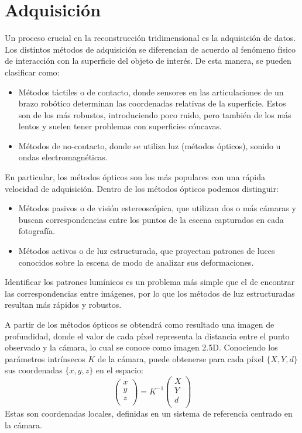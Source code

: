 \section{Adquisición}
Un proceso crucial en la reconstrucción tridimensional es la adquisición de datos.
Los distintos métodos de adquisición se diferencian de acuerdo al fenómeno físico de interacción
con la superficie del objeto de interés. De esta manera, se pueden clasificar como:
	\begin{itemize}
		\item Métodos táctiles o de contacto, donde sensores en las articulaciones de un brazo robótico determinan las coordenadas relativas de la superficie. Estos son de los más robustos, introduciendo poco ruido, pero también de los más lentos y suelen tener problemas con superficies cóncavas.
		\item Métodos de no-contacto, donde se utiliza luz (métodos ópticos), sonido u ondas electromagnéticas.
	\end{itemize}

En particular, los métodos ópticos son los más populares con una rápida velocidad de adquisición\cite{Várady97reverseengineering}. %
Dentro de los métodos ópticos podemos distinguir:
\begin{itemize}
	\item Métodos pasivos o de visión estereoscópica,
		que utilizan dos o más cámaras y buscan correspondencias
		entre los puntos de la escena capturados en cada fotografía.
	\item Métodos activos o de luz estructurada,
		que proyectan patrones de luces conocidos sobre la escena de modo de analizar sus deformaciones.
\end{itemize}
Identificar los patrones lumínicos es un problema más simple que el de
encontrar las correspondencias entre imágenes, por lo que los métodos de luz
estructuradas resultan más rápidos y robustos\cite{Pancho}.

A partir de los métodos ópticos se obtendrá como resultado una imagen de profundidad, donde el valor de
cada píxel representa la distancia entre el punto observado y la cámara, lo cual se conoce como imagen 2.5D.
Conociendo los parámetros intrínsecos $K$ de la cámara,
puede obtenerse para cada píxel $\{X, Y, d\}$ sus coordenadas $\{x, y, z\}$ en el espacio:
\[
	\left(\begin{matrix}
		x \\ y \\ z \\
	\end{matrix}\right) = 
	K^{-1}
	\left(\begin{matrix}
		X \\ Y \\ d \\
	\end{matrix}\right)
\]
Estas son coordenadas locales, definidas en un sistema de referencia centrado en la cámara.



